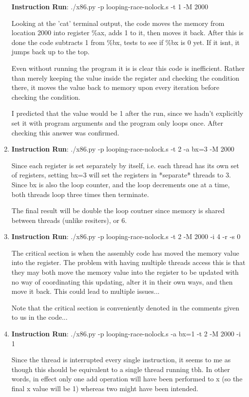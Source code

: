 \documentclass{article}
\begin{document}
\begin{enumerate}
\textbf{Instruction Run}: ./x86.py -p looping-race-nolock.s -t 1 -M 2000

Looking at the 'cat' terminal output, the code moves the memory from location 2000 into register
\%ax, adds 1 to it, then moves it back. After this is done the code subtracts 1 from \%bx, tests
to see if \%bx is 0 yet. If it isnt, it jumps back up to the top. 

Even without running the program it is is clear this code is inefficient. Rather than merely
keeping the value inside the register and checking the condition there, it moves the value
back to memory upon every iteration before checking the condition. 

I predicted that the value would be 1 after the run, since we hadn't explicitly set it with
program arguments and the program only loops once. After checking this answer was confirmed.

\item  

\textbf{Instruction Run}: ./x86.py -p looping-race-nolock.s -t 2 -a bx=3 -M 2000

Since each register is set separately by itself, i.e. each thread has its own set of registers,
setting bx=3 will set the registers in *separate* threads to 3. Since bx is also the loop counter,
and the loop decrements one at a time, both threads loop three times then terminate. 

The final result will be double the loop coutner since memory is shared between threads (unlike
resiters), or 6. 

\item 

\textbf{Instruction Run}: ./x86.py -p looping-race-nolock.s -t 2 -M 2000 -i 4 -r -s 0

The critical section is when the assembly code has moved the memory value into the register. 
The problem with having multiple threads access this is that they may both move the memory
value into the register to be updated with no way of coordinating this updating, alter it in
their own ways, and then move it back. This could lead to multiple issues...

Note that the critical section is conveniently denoted in the comments given to us in the 
code...

\item 

\textbf{Instruction Run}: ./x86.py -p looping-race-nolock.s -a bx=1 -t 2 -M 2000 -i 1

Since the thread is interrupted every single instruction, it seems to me as though this
should be equivalent to a single thread running tbh. In other words, in effect only
one add operation will have been performed to x (so the final x value will be 1) whereas
two might have been intended. 


\end{enumerate}
\end{document}
